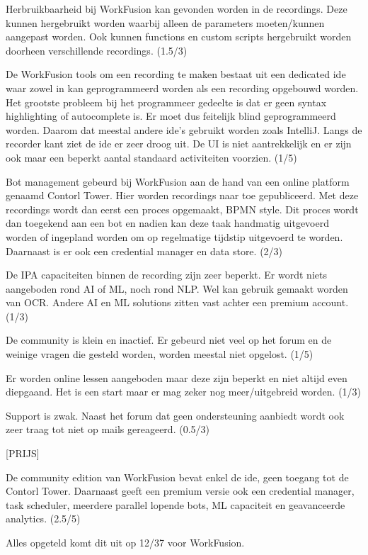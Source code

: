 Herbruikbaarheid bij WorkFusion kan gevonden worden in de recordings. Deze kunnen hergebruikt worden waarbij alleen de parameters moeten/kunnen aangepast worden. Ook kunnen functions en custom scripts hergebruikt worden doorheen verschillende recordings. (1.5/3)

De WorkFusion tools om een recording te maken bestaat uit een dedicated ide waar zowel in kan geprogrammeerd worden als een recording opgebouwd worden. Het grootste probleem bij het programmeer gedeelte is dat er geen syntax highlighting of autocomplete is. Er moet dus feitelijk blind geprogrammeerd worden. Daarom dat meestal andere ide's gebruikt worden zoals IntelliJ. Langs de recorder kant ziet de ide er zeer droog uit. De UI is niet aantrekkelijk en er zijn ook maar een beperkt aantal standaard activiteiten voorzien. (1/5)

Bot management gebeurd bij WorkFusion aan de hand van een online platform genaamd Contorl Tower. Hier worden recordings naar toe gepubliceerd. Met deze recordings wordt dan eerst een proces opgemaakt, BPMN style. Dit proces wordt dan toegekend aan een bot en nadien kan deze taak handmatig uitgevoerd worden of ingepland worden om op regelmatige tijdstip uitgevoerd te worden. Daarnaast is er ook een credential manager en data store. (2/3)

De IPA capaciteiten binnen de recording zijn zeer beperkt. Er wordt niets aangeboden rond AI of ML, noch rond NLP. Wel kan gebruik gemaakt worden van OCR. Andere AI en ML solutions zitten vast achter een premium account. (1/3)

De community is klein en inactief. Er gebeurd niet veel op het forum en de weinige vragen die gesteld worden, worden meestal niet opgelost. (1/5)

Er worden online lessen aangeboden maar deze zijn beperkt en niet altijd even diepgaand. Het is een start maar er mag zeker nog meer/uitgebreid worden. (1/3)

Support is zwak. Naast het forum dat geen ondersteuning aanbiedt wordt ook zeer traag tot niet op mails gereageerd. (0.5/3)

[PRIJS]

De community edition van WorkFusion bevat enkel de ide, geen toegang tot de Contorl Tower. Daarnaast geeft een premium versie ook een credential manager, task scheduler, meerdere parallel lopende bots, ML capaciteit en geavanceerde analytics. (2.5/5)

Alles opgeteld komt dit uit op 12/37 voor WorkFusion.

